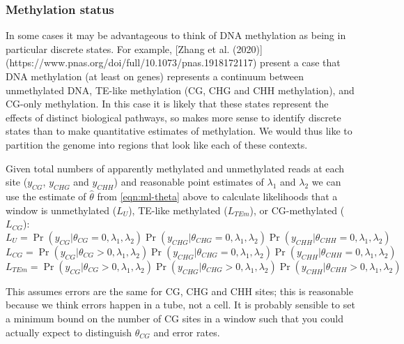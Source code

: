 \documentclass[12pt,longbibliography]{article}
\begin{document}
\subsubsection{Methylation status}

In some cases it may be advantageous to think of DNA methylation as being in particular discrete states.
For example, [Zhang et al. (2020)](https://www.pnas.org/doi/full/10.1073/pnas.1918172117) present a case that DNA methylation (at least on genes) represents a continuum between unmethylated DNA, TE-like methylation (CG, CHG and CHH methylation), and CG-only methylation.
In this case it is likely that these states represent the effects of distinct biological pathways, so makes more sense to identify discrete states than to make quantitative estimates of methylation.
We would thus like to partition the genome into regions that look like each of these contexts.

Given total numbers of apparently methylated and unmethylated reads at each site ($y_{CG}$, $y_{CHG}$ and $y_{CHH}$) and reasonable point estimates of $\lambda_1$ and $\lambda_2$ we can use the estimate of $\hat{\theta}$ from \ref{eqn:ml-theta} above to calculate likelihoods that a window is unmethylated ($L_U$), TE-like methylated ($L_{TEm}$), or CG-methylated ($L_{CG}$):
\begin{equation}
    \label{eqn:lik-unmethylated}
    L_{U} = 
    \Pr( y_{CG} | \theta_{CG} =0, \lambda_1, \lambda_2)
    \Pr(y_{CHG} | \theta_{CHG}=0, \lambda_1, \lambda_2)
    \Pr(y_{CHH} | \theta_{CHH}=0, \lambda_1, \lambda_2)
\end{equation}
\begin{equation}
    \label{eqn:lik-mCG}
    L_{CG} = 
    \Pr( y_{CG} | \theta_{CG}>0, \lambda_1, \lambda_2)
    \Pr(y_{CHG} | \theta_{CHG}=0, \lambda_1, \lambda_2)
    \Pr(y_{CHH} | \theta_{CHH}=0, \lambda_1, \lambda_2)
\end{equation}
\begin{equation}
    \label{eqn:lik-TEm}
    L_{TEm} = 
    \Pr( y_{CG} | \theta_{CG}>0, \lambda_1, \lambda_2)
    \Pr(y_{CHG} | \theta_{CHG}>0, \lambda_1, \lambda_2)
    \Pr(y_{CHH} | \theta_{CHH}>0, \lambda_1, \lambda_2)
\end{equation}

This assumes errors are the same for CG, CHG and CHH sites; this is reasonable because we think errors happen in a tube, not a cell. It is probably sensible to set a minimum bound on the number of CG sites in a window such that you could actually expect to distinguish $\theta_{CG}$ and error rates.
\end{document}
